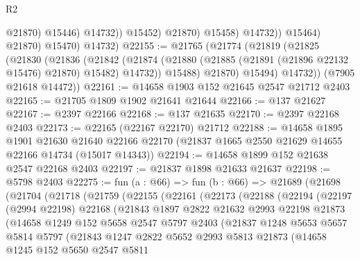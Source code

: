 \begin{lexlean}{R2}
\begin{coremodule}
                              @21870)
                            @15446)
                          @14732))
                      @15452)
                    @21870)
                  @15458)
                @14732))
            @15464)
          @21870)
        @15470)
      @14732)
@22155 := @21765
    (@21774
      (@21819
        (@21825
          (@21830
            (@21836
              (@21842
                (@21874 (@21880 (@21885 (@21891 (@21896 @22132 @15476) @21870) @15482) @14732))
                @15488)
              @21870)
            @15494)
          @14732))
      (@7905 @21618 @14472))
@22161 := @14658 @1903 @152 @21645 @2547 @21712 @2403
@22165 := @21705 @1809 @1902 @21641 @21644
@22166 := @137 @21627
@22167 := @2397 @22166
@22168 := @137 @21635
@22170 := @2397 @22168 @2403
@22173 := @22165 (@22167 @22170) @21712
@22188 := @14658
    @1895
    @1901
    @21630
    @21640
    @22166
    @22170
    (@21837 @1665 @2550 @21629 @14655 @22166 @14734 (@15017 @14343))
@22194 := @14658 @1899 @152 @21638 @2547 @22168 @2403
@22197 := @21837 @1898 @21633 @21637
@22198 := @5798 @2403
@22275 := fun (a : @66) =>
  fun (b : @66) =>
  @21689
    (@21698
      (@21704
        (@21718
          (@21759
            (@22155
              (@22161
                (@22173
                  (@22188
                    (@22194
                      (@22197
                        (@2994 @22198)
                        @22168
                        (@21843
                          @1897
                          @2822
                          @21632
                          @2993
                          @22198
                          @21873
                          (@14658
                            @1249
                            @152
                            @5658
                            @2547
                            @5797
                            @2403
                            (@21837
                              @1248
                              @5653
                              @5657
                              @5814
                              @5797
                              (@21843
                                @1247
                                @2822
                                @5652
                                @2993
                                @5813
                                @21873
                                (@14658
                                  @1245
                                  @152
                                  @5650
                                  @2547
                                  @5811

\end{coremodule}
\end{lexlean}
